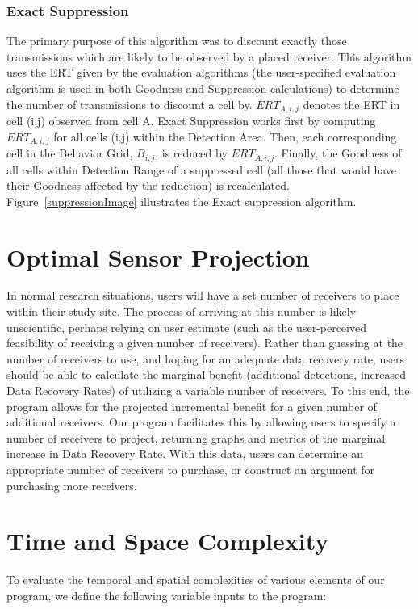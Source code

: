 \subsubsection{Exact Suppression}
\label{exactSuppression}
The primary purpose of this algorithm was to discount exactly those transmissions which are likely to be observed by a placed receiver.  This algorithm uses the ERT given by the evaluation algorithms (the user-specified evaluation algorithm is used in both Goodness and Suppression calculations) to determine the number of transmissions to discount a cell by.  $ERT_{A,i,j}$ denotes the ERT in cell (i,j) observed from cell A.  Exact Suppression works first by computing $ERT_{A,i,j}$ for all cells (i,j)  within the Detection Area.  Then, each corresponding cell in the Behavior Grid, $B_{i,j}$, is reduced by $ERT_{A,i,j}$.  Finally, the Goodness of all cells within Detection Range of a suppressed cell (all those that would have their Goodness affected by the reduction) is recalculated.  Figure~\ref{suppressionImage} illustrates the Exact suppression algorithm.  

\section{Optimal Sensor Projection}
In normal research situations, users will have a set number of receivers to place within their study site.  The process of arriving at this number is likely unscientific, perhaps relying on user estimate (such as the user-perceived feasibility of receiving a given number of receivers).  Rather than guessing at the number of receivers to use, and hoping for an adequate data recovery rate, users should be able to calculate the marginal benefit (additional detections, increased Data Recovery Rates) of utilizing a variable number of receivers.   To this end, the program allows for the projected incremental benefit for a given number of additional receivers.  Our program facilitates this by allowing users to specify a number of receivers to project, returning graphs and metrics of the marginal increase in Data Recovery Rate.  With this data, users can determine an appropriate number of receivers to purchase, or construct an argument for purchasing more receivers.


\section{Time and Space Complexity}
\label{computationalComplexity}
To evaluate the temporal and spatial complexities of various elements of our program, we define the following variable inputs to the program:\newline


